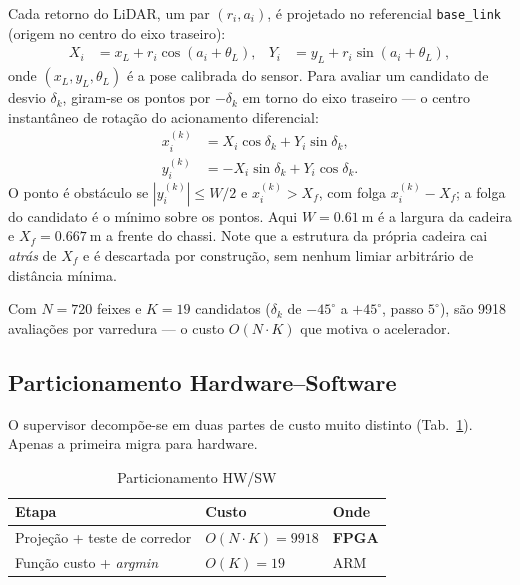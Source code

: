 \documentclass[conference]{IEEEtran}
\begin{document}
Cada retorno do LiDAR, um par $(r_i, a_i)$, \'e projetado no referencial
\texttt{base\_link} (origem no centro do eixo traseiro):
\begin{align}
X_i &= x_L + r_i\cos(a_i + \theta_L), &
Y_i &= y_L + r_i\sin(a_i + \theta_L),
\label{eq:proj}
\end{align}
\noindent onde $(x_L, y_L, \theta_L)$ \'e a pose calibrada do sensor. Para avaliar
um candidato de desvio $\delta_k$, giram-se os pontos por $-\delta_k$ em torno do
eixo traseiro --- o centro instant\^aneo de rota\c{c}\~ao do acionamento
diferencial:
\begin{align}
x^{(k)}_i &= X_i\cos\delta_k + Y_i\sin\delta_k, \\
y^{(k)}_i &= -X_i\sin\delta_k + Y_i\cos\delta_k .
\label{eq:rot}
\end{align}
O ponto \'e obst\'aculo se $|y^{(k)}_i| \le W/2$ e $x^{(k)}_i > X_f$, com folga
$x^{(k)}_i - X_f$; a folga do candidato \'e o m\'inimo sobre os pontos. Aqui
$W=\SI{0.61}{\metre}$ \'e a largura da cadeira e $X_f=\SI{0.667}{\metre}$ a frente
do chassi. Note que a estrutura da pr\'opria cadeira cai \emph{atr\'as} de $X_f$ e
\'e descartada por constru\c{c}\~ao, sem nenhum limiar arbitr\'ario de
dist\^ancia m\'inima.

Com $N=\num{720}$ feixes e $K=\num{19}$ candidatos ($\delta_k$ de $-45^\circ$ a
$+45^\circ$, passo $5^\circ$), s\~ao \num{9918} avalia\c{c}\~oes por varredura ---
o custo $O(N\cdot K)$ que motiva o acelerador.

\subsection{Particionamento Hardware--Software}

O supervisor decomp\~oe-se em duas partes de custo muito distinto
(Tab.~\ref{tab:part}). Apenas a primeira migra para hardware.

\begin{table}[!t]
\caption{Particionamento HW/SW}
\label{tab:part}
\centering\footnotesize
\begin{tabular}{@{}lll@{}}
\toprule
\textbf{Etapa} & \textbf{Custo} & \textbf{Onde} \\
\midrule
Proje\c{c}\~ao + teste de corredor & $O(N\!\cdot\!K)=\num{9918}$ & \textbf{FPGA} \\
Fun\c{c}\~ao custo + \emph{argmin} & $O(K)=\num{19}$ & ARM \\
\bottomrule
\end{tabular}
\end{table}
\end{document}
